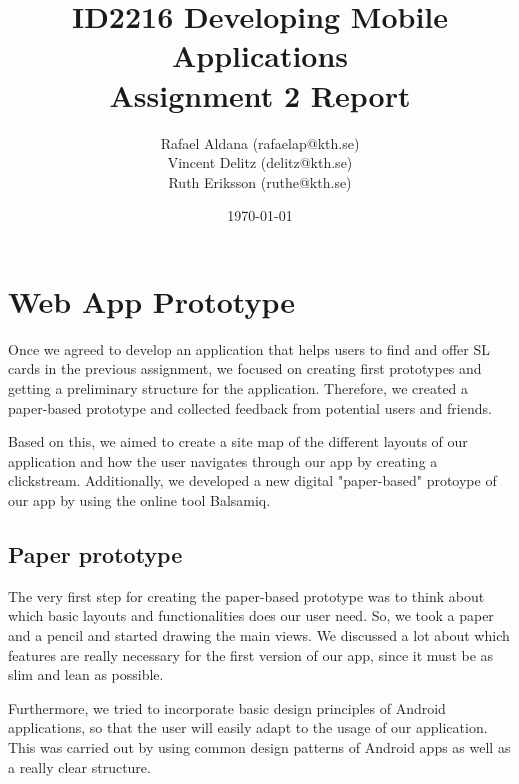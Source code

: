 \documentclass[11pt,twoside,a4paper]{report}
\begin{document}
\title{ID2216 Developing Mobile Applications\\Assignment 2 Report}
\author{Rafael Aldana (rafaelap@kth.se)\\Vincent Delitz (delitz@kth.se)\\Ruth Eriksson (ruthe@kth.se)}
\date{\today}
\maketitle


\tableofcontents
\thispagestyle{empty}



\setcounter{page}{1}
\renewcommand{\chaptername}{Assignment}
\setcounter{chapter}{1}
\chapter{Web App Prototype}

Once we agreed to develop an application that helps users to find and offer SL cards in the previous assignment, we focused on creating first prototypes and getting a preliminary structure for the application. Therefore, we created a paper-based prototype and collected feedback from potential users and friends.

Based on this, we aimed to create a site map of the different layouts of our application and how the user navigates through our app by creating a clickstream. Additionally, we developed a new digital "paper-based" protoype of our app by using the online tool Balsamiq.

\section{Paper prototype}

The very first step for creating the paper-based prototype was to think about which basic layouts and functionalities does our user need. So, we took a paper and a pencil and started drawing the main views. We discussed a lot about which features are really necessary for the first version of our app, since it must be as slim and lean as possible.

Furthermore, we tried to incorporate basic design principles of Android applications, so that the user will easily adapt to the usage of our application. This was carried out by using common design patterns of Android apps as well as a really clear structure.
\end{document}
